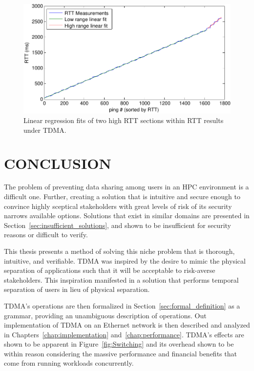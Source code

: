 \documentclass[oneside,12pt]{memoir}
\begin{document}
\begin{figure}
\centering
\includegraphics[scale=0.85]{rtt_2_fits.pdf}
\caption{Linear regression fits of two high RTT sections within RTT results under TDMA.}
\label{fig:rtt_2_fits}
\end{figure}



\chapter{CONCLUSION}
The problem of preventing data sharing among users in an HPC environment is a difficult one. Further, creating a solution that is intuitive and secure enough to convince highly sceptical stakeholders with great levels of risk of its security narrows available options. Solutions that exist in similar domains are presented in Section~\ref{sec:insufficient_solutions}, and shown to be insufficient for security reasons or difficult to verify.

This thesis presents a method of solving this niche problem that is thorough, intuitive, and verifiable. TDMA was inspired by the desire to mimic the physical separation of applications such that it will be acceptable to risk-averse stakeholders. This inspiration manifested in a solution that performs temporal separation of users in lieu of physical separation.

TDMA's operations are then formalized in Section~\ref{sec:formal_definition} as a grammar, providing an unambiguous description of operations. Out implementation of TDMA on an Ethernet network is then described and analyzed in Chapters~\ref{chap:implementation} and~\ref{chap:performance}. TDMA's effects are shown to be apparent in Figure~\ref{fig:Switching} and its overhead shown to be within reason considering the massive performance and financial benefits that come from running workloads concurrently.
\end{document}
